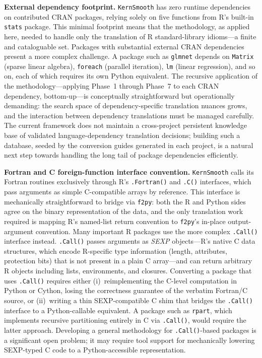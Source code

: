 \documentclass[12pt,a4paper]{article}
\newcommand{\pkg}[1]{\texttt{#1}}
\begin{document}
\textbf{External dependency footprint.} \pkg{KernSmooth} has zero runtime dependencies on contributed CRAN packages, relying solely on five functions from R's built-in \texttt{stats} package. This minimal footprint means that the methodology, as applied here, needed to handle only the translation of R standard-library idioms---a finite and cataloguable set. Packages with substantial external CRAN dependencies present a more complex challenge. A package such as \texttt{glmnet} depends on \texttt{Matrix} (sparse linear algebra), \texttt{foreach} (parallel iteration), \texttt{lm} (linear regression), and so on, each of which requires its own Python equivalent. The recursive application of the methodology---applying Phase~1 through Phase~7 to each CRAN dependency, bottom-up---is conceptually straightforward but operationally demanding: the search space of dependency-specific translation nuances grows, and the interaction between dependency translations must be managed carefully. The current framework does not maintain a cross-project persistent knowledge base of validated language-dependency translation decisions; building such a database, seeded by the conversion guides generated in each project, is a natural next step towards handling the long tail of package dependencies efficiently.

\textbf{Fortran and C foreign-function interface convention.} \pkg{KernSmooth} calls its Fortran routines exclusively through R's \texttt{.Fortran()} and \texttt{.C()} interfaces, which pass arguments as simple C-compatible arrays by reference. This interface is mechanically straightforward to bridge via \pkg{f2py}: both the R and Python sides agree on the binary representation of the data, and the only translation work required is mapping R's named-list return convention to \pkg{f2py}'s in-place output-argument convention. Many important R packages use the more complex \texttt{.Call()} interface instead. \texttt{.Call()} passes arguments as \textit{SEXP} objects---R's native C data structures, which encode R-specific type information (length, attributes, protection bits) that is not present in a plain C array---and can return arbitrary R objects including lists, environments, and closures. Converting a package that uses \texttt{.Call()} requires either (i)~reimplementing the C-level computation in Python or Cython, losing the correctness guarantee of the verbatim Fortran/C source, or (ii)~writing a thin SEXP-compatible C shim that bridges the \texttt{.Call()} interface to a Python-callable equivalent. A package such as \texttt{rpart}, which implements recursive partitioning entirely in C via \texttt{.Call()}, would require the latter approach. Developing a general methodology for \texttt{.Call()}-based packages is a significant open problem; it may require tool support for mechanically lowering SEXP-typed C code to a Python-accessible representation.
\end{document}
